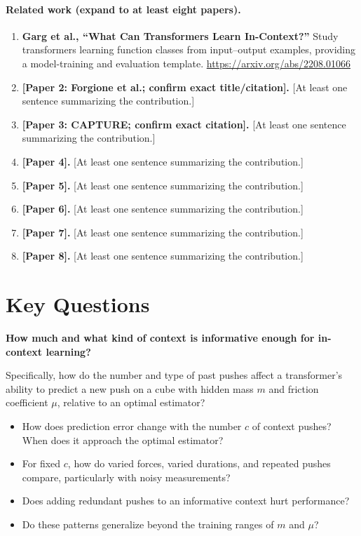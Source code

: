 \documentclass[12pt]{article}
\begin{document}
\paragraph{Related work (expand to at least eight papers).}
\begin{enumerate}
    \item \textbf{Garg et al., ``What Can Transformers Learn In-Context?''} Study transformers learning function classes from input--output examples, providing a model-training and evaluation template. \url{https://arxiv.org/abs/2208.01066}
    \item \textbf{[Paper 2: Forgione et al.; confirm exact title/citation].} [At least one sentence summarizing the contribution.]
    \item \textbf{[Paper 3: CAPTURE; confirm exact citation].} [At least one sentence summarizing the contribution.]
    \item \textbf{[Paper 4].} [At least one sentence summarizing the contribution.]
    \item \textbf{[Paper 5].} [At least one sentence summarizing the contribution.]
    \item \textbf{[Paper 6].} [At least one sentence summarizing the contribution.]
    \item \textbf{[Paper 7].} [At least one sentence summarizing the contribution.]
    \item \textbf{[Paper 8].} [At least one sentence summarizing the contribution.]
\end{enumerate}

\section{Key Questions}
\begin{center}
\textbf{How much and what kind of context is informative enough for in-context learning?}
\end{center}
Specifically, how do the number and type of past pushes affect a transformer's ability to predict a new push on a cube with hidden mass $m$ and friction coefficient $\mu$, relative to an optimal estimator?
\begin{itemize}
    \item How does prediction error change with the number $c$ of context pushes? When does it approach the optimal estimator?
    \item For fixed $c$, how do varied forces, varied durations, and repeated pushes compare, particularly with noisy measurements?
    \item Does adding redundant pushes to an informative context hurt performance?
    \item Do these patterns generalize beyond the training ranges of $m$ and $\mu$?
\end{itemize}
\end{document}
